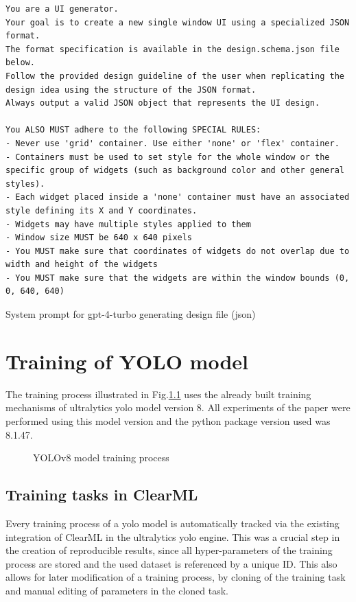 \documentclass[Bachelor, BIC, english, fhCitStyle, IEEE]{BASE/twbook} %
\begin{document}
\begin{listing}[htbp]
    \begin{verbatim}
You are a UI generator.
Your goal is to create a new single window UI using a specialized JSON format.
The format specification is available in the design.schema.json file below.
Follow the provided design guideline of the user when replicating the design idea using the structure of the JSON format.
Always output a valid JSON object that represents the UI design.

You ALSO MUST adhere to the following SPECIAL RULES:
- Never use 'grid' container. Use either 'none' or 'flex' container.
- Containers must be used to set style for the whole window or the specific group of widgets (such as background color and other general styles).
- Each widget placed inside a 'none' container must have an associated style defining its X and Y coordinates.
- Widgets may have multiple styles applied to them
- Window size MUST be 640 x 640 pixels
- You MUST make sure that coordinates of widgets do not overlap due to width and height of the widgets
- You MUST make sure that the widgets are within the window bounds (0, 0, 640, 640)
    \end{verbatim}
    \caption{System prompt for gpt-4-turbo generating design file (\ac{json})}
    \label{code:gpt4-design-json-system-prompt}
\end{listing}
\clearpage
\chapter{Training of YOLO model}
The training process illustrated in Fig.\ref{fig:yolo-train} uses the already built training mechanisms of ultralytics \ac{yolo} model version 8. All experiments of the paper were performed using this model version and the python package version used was 8.1.47.
\begin{figure}[!htbp]
    \caption{YOLOv8 model training process}
    \centering
    
    \label{fig:yolo-train}
\end{figure}
\section{Training tasks in ClearML}
Every training process of a \ac{yolo} model is automatically tracked via the existing integration of ClearML in the ultralytics \ac{yolo} engine. This was a crucial step in the creation of reproducible results, since all hyper-parameters of the training process are stored and the used dataset is referenced by a unique ID. This also allows for later modification of a training process, by cloning of the training task and manual editing of parameters in the cloned task.
\end{document}
